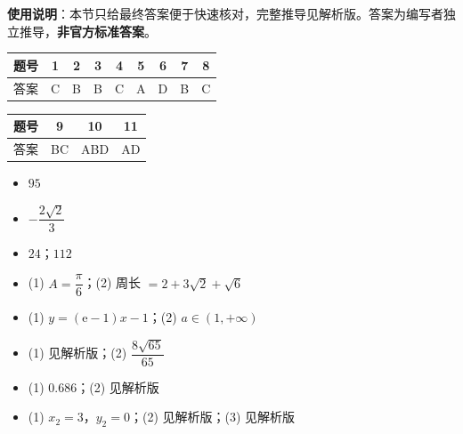 
\begin{gknotice}
\textbf{使用说明}：本节只给最终答案便于快速核对，完整推导见解析版。答案为编写者独立推导，\textbf{非官方标准答案}。
\end{gknotice}

\begin{center}\begin{tabular}{ccccccccc}
\toprule
题号 & 1 & 2 & 3 & 4 & 5 & 6 & 7 & 8 \\
\midrule
答案 & C & B & B & C & A & D & B & C \\
\bottomrule
\end{tabular}\end{center}

\begin{center}\begin{tabular}{cccc}
\toprule
题号 & 9 & 10 & 11 \\
\midrule
答案 & BC & ABD & AD \\
\bottomrule
\end{tabular}\end{center}

\begin{itemize}[leftmargin=2.6em]
  \item[\textbf{12.}] $95$
  \item[\textbf{13.}] $-\dfrac{2\sqrt2}3$
  \item[\textbf{14.}] $24$；$112$
\end{itemize}

\begin{itemize}[leftmargin=2.6em]
  \item[\textbf{15.}] (1) $A=\dfrac\pi6$；(2) 周长 $=2+3\sqrt2+\sqrt6$
  \item[\textbf{16.}] (1) $y=(\mathrm e-1)x-1$；(2) $a\in(1,+\infty)$
  \item[\textbf{17.}] (1) 见解析版；(2) $\dfrac{8\sqrt{65}}{65}$
  \item[\textbf{18.}] (1) $0.686$；(2) 见解析版
  \item[\textbf{19.}] (1) $x_2=3$，$y_2=0$；(2) 见解析版；(3) 见解析版
\end{itemize}
